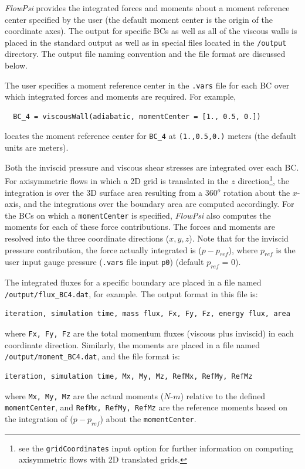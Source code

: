 \documentclass{article}
\begin{document}
{\em FlowPsi} provides the integrated forces and moments about a moment
reference center specified by the user (the default moment center is
the origin of the coordinate axes).  The output for specific BCs as
well as all of the viscous walls is placed in the standard output as
well as in special files located in the \verb!/output! directory.  The
output file naming convention and the file format are discussed below.

The user specifies a moment reference center in the \verb!.vars! file for each BC over which integrated forces and moments are required.  For example,
\begin{verbatim}
  BC_4 = viscousWall(adiabatic, momentCenter = [1., 0.5, 0.])
\end{verbatim}
locates the moment reference center for \verb!BC_4! at \verb!(1.,0.5,0.)! meters (the default units are meters).

Both the inviscid pressure and viscous shear stresses are integrated
over each BC.  For axisymmetric flows in which a 2D grid is translated
in the $z$ direction\footnote{see the {\tt gridCoordinates} input
  option for further information on computing axisymmetric flows with
  2D translated grids.}, the integration is over the 3D surface area
resulting from a 360$^o$ rotation about the $x$-axis, and the
integrations over the boundary area are computed accordingly.  For the
BCs on which a \verb!momentCenter! is specified, {\em FlowPsi} also
computes the moments for each of these force contributions.  The
forces and moments are resolved into the three coordinate directions
($x,y,z$).  Note that for the inviscid pressure contribution, the
force actually integrated is ({\it{$p - p_{ref}$}}), where $p_{ref}$
is the user input gauge pressure ({\tt .vars} file input {\tt p0})
(default $p_{ref}$ = 0).

The integrated fluxes for a specific boundary are placed in a file named \verb!/output/flux_BC4.dat!, for example.  The output format in this file is:
\begin{verbatim}
iteration, simulation time, mass flux, Fx, Fy, Fz, energy flux, area
\end{verbatim}
where \verb!Fx, Fy, Fz! are the total momentum fluxes (viscous plus inviscid) in each coordinate direction.  Similarly, the moments are placed in a file named \verb!/output/moment_BC4.dat!, and the file format is:
\begin{verbatim}
iteration, simulation time, Mx, My, Mz, RefMx, RefMy, RefMz
\end{verbatim}
where \verb!Mx, My, Mz! are the actual moments ($N$-$m$) relative to the defined \verb!momentCenter!, and \verb!RefMx, RefMy, RefMz! are the reference moments based on the integration of ({\it{$p - p_{ref}$}}) about the \verb!momentCenter!.
\end{document}
